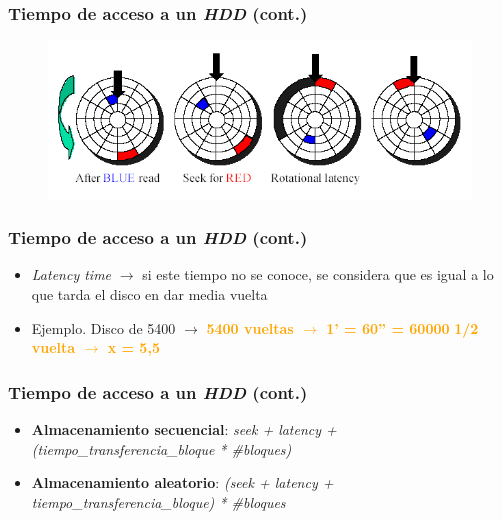 \begin{frame}
  \frametitle{Tiempo de acceso a un \textit{HDD} (cont.)}
  \begin{figure}
      \includegraphics[scale=0.5]{images/dat2.png}
  \end{figure}
\end{frame}

\begin{frame}
  \frametitle{Tiempo de acceso a un \textit{HDD} (cont.)}
  \begin{itemize}
    \item \emph{Latency time} $\rightarrow$ si este tiempo no se conoce, se considera que es igual a lo que tarda el disco en dar media vuelta
    \item Ejemplo. Disco de 5400 \rpm $\rightarrow$
      \linebreak
      \linebreak
      \hspace{35pt} \textcolor{orange}{\textbf{5400 vueltas $\rightarrow$ 1' = 60'' = 60000 \ms}}
      \linebreak  
      \hspace{35pt} \textcolor{orange}{\textbf{1/2 vuelta $\rightarrow$ x = 5,5 \ms}}
  \end{itemize}
\end{frame}

\begin{frame}
  \frametitle{Tiempo de acceso a un \textit{HDD} (cont.)}
  \begin{itemize}
    \item \textbf{Almacenamiento secuencial}:
      \linebreak
      \hspace{35pt} \emph{seek + latency + (tiempo\_transferencia\_bloque * \#bloques)}
    \item \textbf{Almacenamiento aleatorio}:
      \linebreak
      \hspace{35pt} \emph{(seek + latency + tiempo\_transferencia\_bloque) * \#bloques}      
  \end{itemize}
\end{frame}

